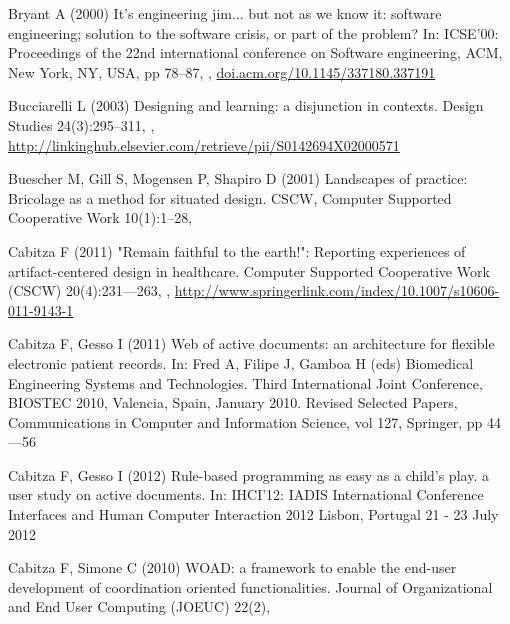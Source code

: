 \documentclass{article}
\begin{document}
\begin{thebibliography}{193}
Bryant A (2000) It's engineering jim... but not as we know it: software
  engineering; solution to the software crisis, or part of the problem? In:
  {ICSE'00:} Proceedings of the 22nd international conference on Software
  engineering, {ACM}, New York, {NY}, {USA}, pp 78--87,
  ,
  \urlprefix\url{doi.acm.org/10.1145/337180.337191}

Bucciarelli L (2003) Designing and learning: a disjunction in contexts. Design
  Studies 24(3):295--311, ,
  \urlprefix\url{http://linkinghub.elsevier.com/retrieve/pii/S0142694X02000571}

Buescher M, Gill S, Mogensen P, Shapiro D (2001) Landscapes of practice:
  Bricolage as a method for situated design. {CSCW}, Computer Supported
  Cooperative Work 10(1):1--28, 

Cabitza F (2011) {"Remain} faithful to the earth!": Reporting experiences of
  artifact-centered design in healthcare. Computer Supported Cooperative Work
  {(CSCW)} 20(4):231---263, ,
  \urlprefix\url{http://www.springerlink.com/index/10.1007/s10606-011-9143-1}

Cabitza F, Gesso I (2011) Web of active documents: an architecture for flexible
  electronic patient records. In: Fred A, Filipe J, Gamboa H (eds) Biomedical
  Engineering Systems and Technologies. Third International Joint Conference,
  {BIOSTEC} 2010, Valencia, Spain, January 2010. Revised Selected Papers,
  Communications in Computer and Information Science, vol 127, Springer, pp
  44---56

Cabitza F, Gesso I (2012) Rule-based programming as easy as a child's play. a
  user study on active documents. In: {IHCI'12:} {IADIS} International
  Conference Interfaces and Human Computer Interaction 2012 Lisbon, Portugal 21
  - 23 July 2012

Cabitza F, Simone C (2010) {WOAD:} a framework to enable the end-user
  development of coordination oriented functionalities. Journal of
  Organizational and End User Computing {(JOEUC)} 22(2),


\end{thebibliography}
\end{document}
